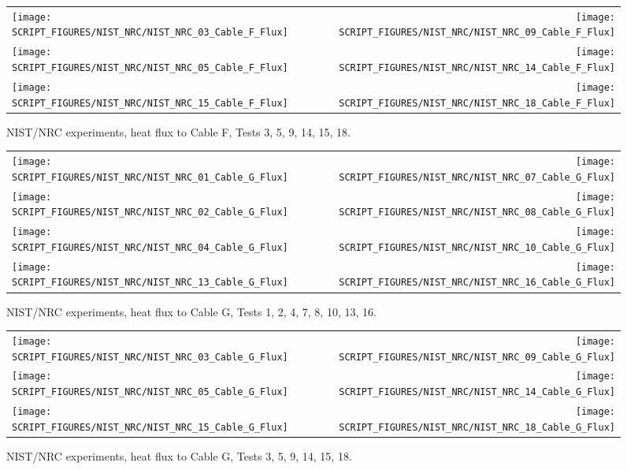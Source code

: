 \begin{figure}[p]
\begin{tabular*}{\textwidth}{l@{\extracolsep{\fill}}r}
\texttt{[image: SCRIPT\_FIGURES/NIST\_NRC/NIST\_NRC\_03\_Cable\_F\_Flux]} &
\texttt{[image: SCRIPT\_FIGURES/NIST\_NRC/NIST\_NRC\_09\_Cable\_F\_Flux]} \\
\texttt{[image: SCRIPT\_FIGURES/NIST\_NRC/NIST\_NRC\_05\_Cable\_F\_Flux]} &
\texttt{[image: SCRIPT\_FIGURES/NIST\_NRC/NIST\_NRC\_14\_Cable\_F\_Flux]} \\
\texttt{[image: SCRIPT\_FIGURES/NIST\_NRC/NIST\_NRC\_15\_Cable\_F\_Flux]} &
\texttt{[image: SCRIPT\_FIGURES/NIST\_NRC/NIST\_NRC\_18\_Cable\_F\_Flux]}
\end{tabular*}
\caption{NIST/NRC experiments, heat flux to Cable F, Tests 3, 5, 9, 14, 15, 18.}
\label{NIST_NRC_Cable_F_Flux_Open}
\end{figure}

\begin{figure}[p]
\begin{tabular*}{\textwidth}{l@{\extracolsep{\fill}}r}
\texttt{[image: SCRIPT\_FIGURES/NIST\_NRC/NIST\_NRC\_01\_Cable\_G\_Flux]} &
\texttt{[image: SCRIPT\_FIGURES/NIST\_NRC/NIST\_NRC\_07\_Cable\_G\_Flux]} \\
\texttt{[image: SCRIPT\_FIGURES/NIST\_NRC/NIST\_NRC\_02\_Cable\_G\_Flux]} &
\texttt{[image: SCRIPT\_FIGURES/NIST\_NRC/NIST\_NRC\_08\_Cable\_G\_Flux]} \\
\texttt{[image: SCRIPT\_FIGURES/NIST\_NRC/NIST\_NRC\_04\_Cable\_G\_Flux]} &
\texttt{[image: SCRIPT\_FIGURES/NIST\_NRC/NIST\_NRC\_10\_Cable\_G\_Flux]} \\
\texttt{[image: SCRIPT\_FIGURES/NIST\_NRC/NIST\_NRC\_13\_Cable\_G\_Flux]} &
\texttt{[image: SCRIPT\_FIGURES/NIST\_NRC/NIST\_NRC\_16\_Cable\_G\_Flux]}
\end{tabular*}
\caption{NIST/NRC experiments, heat flux to Cable G, Tests 1, 2, 4, 7, 8, 10, 13, 16.}
\label{NIST_NRC_Cable_G_Flux_Closed}
\end{figure}

\begin{figure}[p]
\begin{tabular*}{\textwidth}{l@{\extracolsep{\fill}}r}
\texttt{[image: SCRIPT\_FIGURES/NIST\_NRC/NIST\_NRC\_03\_Cable\_G\_Flux]} &
\texttt{[image: SCRIPT\_FIGURES/NIST\_NRC/NIST\_NRC\_09\_Cable\_G\_Flux]} \\
\texttt{[image: SCRIPT\_FIGURES/NIST\_NRC/NIST\_NRC\_05\_Cable\_G\_Flux]} &
\texttt{[image: SCRIPT\_FIGURES/NIST\_NRC/NIST\_NRC\_14\_Cable\_G\_Flux]} \\
\texttt{[image: SCRIPT\_FIGURES/NIST\_NRC/NIST\_NRC\_15\_Cable\_G\_Flux]} &
\texttt{[image: SCRIPT\_FIGURES/NIST\_NRC/NIST\_NRC\_18\_Cable\_G\_Flux]}
\end{tabular*}
\caption{NIST/NRC experiments, heat flux to Cable G, Tests 3, 5, 9, 14, 15, 18.}
\label{NIST_NRC_Cable_G_Flux_Open}
\end{figure}

